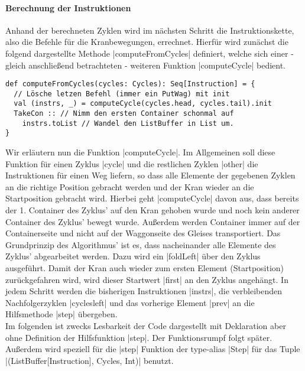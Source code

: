\paragraph{Berechnung der Instruktionen}
Anhand der berechneten Zyklen wird im nächsten Schritt die Instruktionskette, also die Befehle für die Kranbewegungen, errechnet.
Hierfür wird zunächst die folgend dargestellte Methode |computeFromCycles| definiert,
welche sich einer - gleich anschließend betrachteten - weiteren Funktion |computeCycle| bedient.
\lstset{basicstyle=\ttfamily}
\begin{lstlisting}
def computeFromCycles(cycles: Cycles): Seq[Instruction] = {
  // Lösche letzen Befehl (immer ein PutWag) mit init
  val (instrs, _) = computeCycle(cycles.head, cycles.tail).init
  TakeCon :: // Nimm den ersten Container schonmal auf
    instrs.toList // Wandel den ListBuffer in List um.
}
\end{lstlisting}
\lstset{basicstyle=\ttfamily}
Wir erläutern nun die Funktion |computeCycle|.
Im Allgemeinen soll diese Funktion für einen Zyklus |cycle| und die restlichen Zyklen |other| die Instruktionen für einen Weg liefern,
so dass alle Elemente der gegebenen Zyklen an die richtige Position gebracht werden und der Kran wieder an die Startposition gebracht wird.
Hierbei geht |computeCycle| davon aus, dass bereits der 1. Container des Zyklus' auf den Kran gehoben wurde und noch kein anderer Container des Zyklus' bewegt wurde.
Außerdem werden Container immer auf der Containerseite und nicht auf der Waggonseite des Gleises transportiert.
Das Grundprinzip des Algorithmus' ist es, dass nacheinander alle Elemente des Zyklus' abgearbeitet werden.
Dazu wird ein |foldLeft| über den Zyklus ausgeführt.
Damit der Kran auch wieder zum ersten Element (Startposition) zurückgefahren wird, wird dieser Startwert |first| an den Zyklus angehängt.
In jedem Schritt werden die bisherigen Instruktionen |instrs|, die verbleibenden Nachfolgerzyklen |cyclesleft| und das vorherige Element |prev|
an die Hilfsmethode |step| übergeben. \\
Im folgenden ist zwecks Lesbarkeit der Code dargestellt mit Deklaration aber ohne Definition der Hilfsfunktion |step|.
Der Funktionsrumpf folgt später.
Außerdem wird speziell für die |step| Funktion der type-alias |Step| für das Tuple |(ListBuffer[Instruction], Cycles, Int)| benutzt.
\lstset{basicstyle=\ttfamily}
